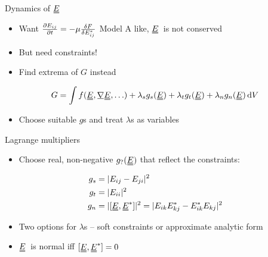 \documentclass[10pt,mathserif]{beamer}
\newcommand{\suf}[2]{\stackunder[0.5pt]{\stackunder[1pt]{\ensuremath{#1}}{\rule{\widthof{\ensuremath{#2}}*\real{0.9}}{.1ex}}}{}}
\newcommand{\duf}[2]{\stackunder[0.5pt]{\stackunder[0.8pt]{\stackunder[1pt]{\ensuremath{#1}}{\rule{\widthof{\ensuremath{#2}}*\real{0.9}}{.1ex}}}{\rule{\widthof{\ensuremath{#2}}*\real{0.9}}{.1ex}}}{}}
\newcommand{\su}[1]{\suf{#1}{#1}}
\newcommand{\du}[1]{\duf{#1}{#1}}
\newcommand{\EE}{\ensuremath{\du{E}}}
\begin{document}
\begin{frame}[fragile]{Dynamics of \EE}
    \newrefsection
    \begin{itemize}
        \item Want $\pdv{E_{ij}}{t} = -\mu\fdv{F}{E_{ij}^*}$ \color{gray} Model A like, \EE\ is not conserved \normalcolor
        \item But need constraints!
        \item Find extrema of $G$ instead
    \end{itemize}
    \begin{align*}
        G = \int f(\du{E}, \su{\nabla}\du{E}, \ldots) + \lambda_s g_s(\du{E}) + \lambda_t g_t(\du{E}) + \lambda_n g_n(\du{E}) \dd{V}
    \end{align*}
    \begin{itemize}
        \item Choose suitable $g$s and treat $\lambda$s as variables
    \end{itemize}
\end{frame}

\begin{frame}[fragile]{Lagrange multipliers}
    \newrefsection
    \begin{itemize}
        \item Choose real, non-negative $g_?(\du{E})$ that reflect the constraints:
    \end{itemize}
    \begin{align*}
        g_s &= |E_{ij} - E_{ji}|^2 \\
        g_t &= |E_{ii}|^2 \\
        g_n &= |[\du{E}, \du{E}^*]|^2 = |E_{ik}E_{kj}^* - E_{ik}^*E_{kj}|^2
    \end{align*}
    \begin{itemize}
        \item Two options for $\lambda$s -- soft constraints or approximate analytic form
        \item \color{gray} \EE\ is normal iff $[\du{E}, \du{E}^*] = 0$ \normalcolor
    \end{itemize}
\end{frame}
\end{document}
